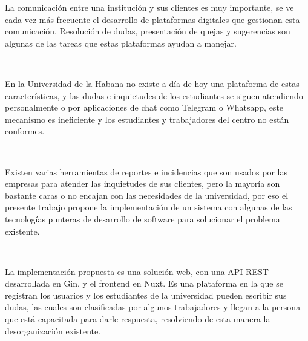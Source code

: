 \begin{resumen}
	La comunicación entre una institución y sus clientes es muy importante, se ve cada vez más frecuente el desarrollo de plataformas digitales que gestionan esta comunicación. Resolución de dudas, presentación de quejas y sugerencias son algunas de las tareas que estas plataformas ayudan a manejar.
	
	\mewline
	\
	
	En la Universidad de la Habana no existe a día de hoy una plataforma de estas características, y las dudas e inquietudes de los estudiantes se siguen atendiendo personalmente o por aplicaciones de chat como Telegram o Whatsapp, este mecanismo es ineficiente y los estudiantes y trabajadores del centro no están conformes.

	\newline
	\
	
	Existen varias herramientas de reportes e incidencias que son usados por las empresas para atender las inquietudes de sus clientes, pero la mayoría son bastante caras o no encajan con las necesidades de la universidad, por eso el presente trabajo propone la implementación de un sistema con algunas de las tecnologías punteras de desarrollo de software para solucionar el problema existente.
	
	\newline
	\
	
	La implementación propuesta es una solución web, con una API REST desarrollada en Gin, y el frontend en Nuxt. Es una plataforma en la que se registran los usuarios y los estudiantes de la universidad pueden escribir sus dudas, las cuales son clasificadas por algunos trabajadores y llegan a la persona que está capacitada para darle respuesta, resolviendo de esta manera la desorganización existente.
\end{resumen}

